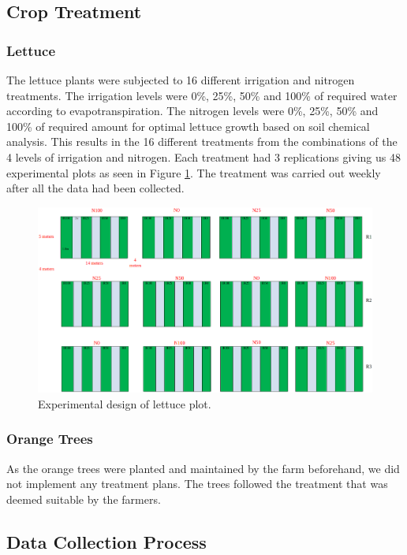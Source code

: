\subsection{Crop Treatment}
\subsubsection{Lettuce}
The lettuce plants were subjected to 16 different irrigation and nitrogen treatments. The irrigation levels were 0\%, 25\%, 50\% and 100\% of required water according to evapotranspiration. The nitrogen levels were 0\%, 25\%, 50\% and 100\% of required amount for optimal lettuce growth based on soil chemical analysis. This results in the 16 different treatments from the combinations of the 4 levels of irrigation and nitrogen. Each treatment had 3 replications giving us 48 experimental plots as seen in Figure \ref{lettuce_plot}. The treatment was carried out weekly after all the data had been collected.


\begin{figure}
    \centering
    \includegraphics[width=1.0\textwidth]{images/plot.png}
    \caption{Experimental design of lettuce plot.}
    \label{lettuce_plot}
\end{figure}

\subsubsection{Orange Trees}
As the orange trees were planted and maintained by the farm beforehand, we did not implement any treatment plans. The trees followed the treatment that was deemed suitable by the farmers.

\subsection{Data Collection Process}

